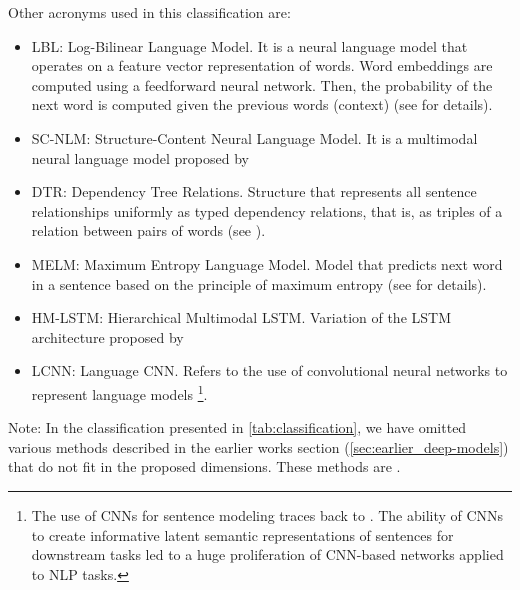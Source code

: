 Other acronyms used in this classification are:
\begin{itemize}
\item LBL: Log-Bilinear Language Model. It is a neural language model that operates on a feature vector representation of words. Word embeddings are computed using a feedforward neural network. Then, the probability of the next word is computed given the previous words (context) (see \citep{Mnih2007} for details).
\item SC-NLM: Structure-Content Neural Language Model. It is a multimodal neural language model proposed by \citep{Kiros2014_VS}
\item DTR: Dependency Tree Relations. Structure that represents all sentence relationships uniformly as typed dependency relations, that is, as triples of a relation between pairs of words (see \citep{DeMarneffe2006}).
\item MELM: Maximum Entropy Language Model. Model that predicts next word in a sentence based on the principle of maximum entropy (see \citep{Berger1996} for details).
\item HM-LSTM: Hierarchical Multimodal LSTM. Variation of the LSTM architecture proposed by \citet{Niu2017}
\item LCNN: Language CNN. Refers to the use of convolutional neural networks to represent language models \footnote{The use of CNNs for sentence modeling traces back to \citet{Collobert2008}. The ability of CNNs to create informative latent semantic representations of sentences for downstream tasks  \citet{Collobert2011,Kalchbrenner2014,Kim2014} led to a huge proliferation of CNN-based networks applied to NLP tasks.}. 
\end{itemize}

Note: In the classification presented in \cref{tab:classification}, we have omitted various methods described in the earlier works section (\cref{sec:earlier_deep-models}) that do not fit in the proposed dimensions. These methods are \citet{Socher2014, Lebret2015a, Lebret2015b, Yagcioglu2015}.

